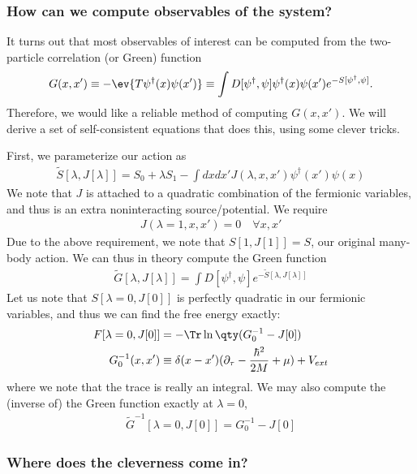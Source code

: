 \documentclass{article}
\begin{document}
\subsubsection*{How can we compute observables of the system?}

It turns out that most observables of interest can be computed from the two-particle correlation (or Green) function
\begin{align*}
  G(x, x') \equiv -\ev{T \psi^\dagger(x) \psi(x')} \equiv \int D[\psi^\dagger, \psi] \psi^\dagger (x) \psi(x') e^{-S[\psi^\dagger, \psi]}.
\end{align*}
Therefore, we would like a reliable method of computing $G(x, x')$. We will derive a set of self-consistent equations that does this, using some clever tricks.

First, we parameterize our action as
\begin{align}
  \tilde S[\lambda, J[\lambda]] = S_0 + \lambda S_1 - \int dx dx' J(\lambda, x, x') \psi^\dagger(x') \psi(x)
\end{align}
We note that $J$ is attached to a quadratic combination of the fermionic variables, and thus is an extra noninteracting source/potential. We require
\begin{align}
  J(\lambda=1, x, x') = 0 \quad \forall x, x'
\end{align}
Due to the above requirement, we note that $S[1, J[1]] = S$, our original many-body action. We can thus in theory compute the Green function
\begin{align*}
  \tilde G[\lambda, J[\lambda]] = \int D[\psi^\dagger, \psi] e^{-\tilde S[\lambda, J[\lambda]]}
\end{align*}
Let us note that $S[\lambda=0, J[0]]$ is perfectly quadratic in our fermionic variables, and thus we can find the free energy exactly: 
\begin{align}
  F[\lambda=0, J[0]] & = -\Tr \ln\qty(G_0^{-1} - J[0]) \\
  G_0^{-1}(x, x') & \equiv \delta(x-x')(\partial_\tau - \frac{\hbar^2}{2M} + \mu) + V_{ext}
\end{align}
where we note that the trace is really an integral. We may also compute the (inverse of) the Green function exactly at $\lambda=0$, 
\begin{align*}
  \tilde G^{-1}[\lambda=0, J[0]] = G_0^{-1} - J[0]
\end{align*}

\subsubsection*{Where does the cleverness come in?}
\end{document}
